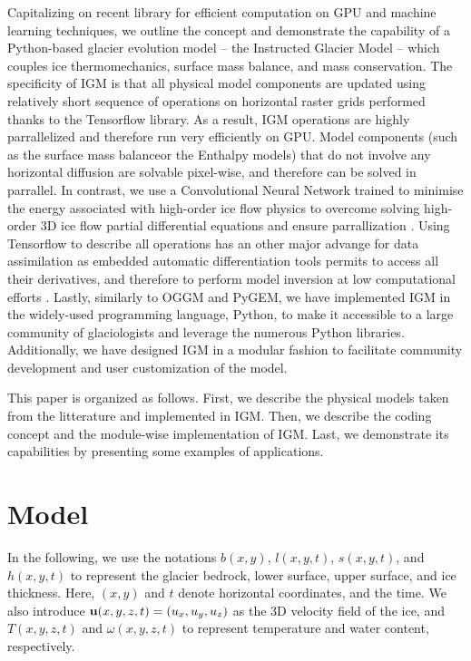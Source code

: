 \documentclass[10pt,twocolumn]{article}
\begin{document}
Capitalizing on recent library for efficient computation on GPU and machine learning
techniques, we outline the concept and demonstrate the capability of a Python-based
glacier evolution model -- the Instructed Glacier Model \citep[IGM,][]{jouvet2022deep} -- 
which couples ice thermomechanics, surface mass balance, and mass conservation. 
The specificity of IGM is that all physical model components are updated using relatively short 
sequence of operations on horizontal raster grids performed thanks to the Tensorflow library. 
As a result, IGM operations are highly parrallelized and therefore run very efficiently on GPU. 
Model components (such as the surface mass balanceor the Enthalpy models) 
that do not involve any horizontal 
diffusion are solvable pixel-wise, and therefore can be solved in parrallel. 
In contrast, we use a Convolutional Neural Network trained to minimise the energy associated 
with high-order ice flow physics to overcome solving high-order 3D ice flow partial differential 
equations and ensure parrallization \citep{jouvet2023ice}.
Using Tensorflow to describe all operations has an other major advange for data assimilation 
as embedded automatic differentiation tools permits to access all their derivatives, and therefore
to perform model inversion at low computational efforts \citep{jouvet2023inversion}. 
Lastly, similarly to OGGM and PyGEM,
we have implemented IGM in the widely-used programming language, Python, to make it accessible 
to a large community of glaciologists and leverage the numerous Python libraries. 
Additionally, we have designed IGM in a modular fashion to facilitate community development and 
user customization of the model.

This paper is organized as follows. First, we describe the physical models taken from the 
litterature and implemented in IGM. 
Then, we describe the coding concept and the module-wise implementation of IGM.
Last, we demonstrate its capabilities by presenting some examples of applications.
 
 
 
\section{Model}   

In the following, we use the notations $b(x,y)$, $l(x,y,t)$, $s(x,y,t)$, and $h(x,y,t)$ 
to represent the glacier bedrock, lower surface, upper surface, and ice thickness. 
Here, $(x,y)$ and $t$ denote horizontal coordinates, and the time. 
We also introduce ${\bf u}(x,y,z,t) = (u_x,u_y,u_z)$ as the 3D velocity field of the ice, 
and $T(x, y, z, t)$ and $\omega(x,y,z,t)$ to represent temperature and water content, 
respectively.
\end{document}
